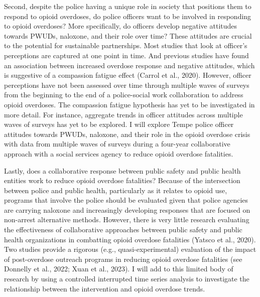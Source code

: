 Second, despite the police having a unique role in society that positions them to respond to opioid overdoses, do police officers want to be involved in responding to opioid overdoses? More specifically, do officers develop negative attitudes towards PWUDs, naloxone, and their role over time? These attitudes are crucial to the potential for sustainable partnerships. Most studies that look at officer’s perceptions are captured at one point in time. And previous studies have found an association between increased overdose response and negative attitudes, which is suggestive of a compassion fatigue effect (Carrol et al., 2020). However, officer perceptions have not been assessed over time through multiple waves of surveys from the beginning to the end of a police-social work collaboration to address opioid overdoses. The compassion fatigue hypothesis has yet to be investigated in more detail. For instance, aggregate trends in officer attitudes across multiple waves of surveys has yet to be explored. I will explore Tempe police officer attitudes towards PWUDs, naloxone, and their role in the opioid overdose crisis with data from multiple waves of surveys during a four-year collaborative approach with a social services agency to reduce opioid overdose fatalities. 

Lastly, does a collaborative response between public safety and public health entities work to reduce opioid overdose fatalities? Because of the intersection between police and public health, particularly as it relates to opioid use, programs that involve the police should be evaluated given that police agencies are carrying naloxone and increasingly developing responses that are focused on non-arrest alternative methods. However, there is very little research evaluating the effectiveness of collaborative approaches between public safety and public health organizations in combatting opioid overdose fatalities (Yatsco et al., 2020). Two studies provide a rigorous (e.g., quasi-experimental) evaluation of the impact of post-overdose outreach programs in reducing opioid overdose fatalities (see Donnelly et al., 2022; Xuan et al., 2023). I will add to this limited body of research by using a controlled interrupted time series analysis to investigate the relationship between the intervention and opioid overdose trends.
